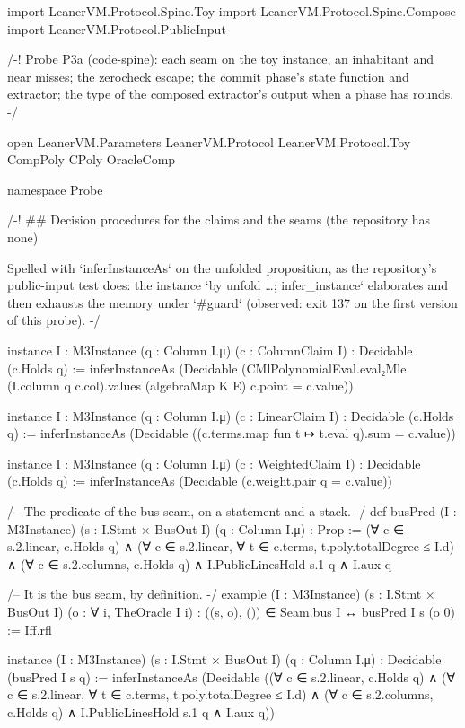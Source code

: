 
\begin{leancode}
import LeanerVM.Protocol.Spine.Toy
import LeanerVM.Protocol.Spine.Compose
import LeanerVM.Protocol.PublicInput

/-!
Probe P3a (code-spine): each seam on the toy instance, an inhabitant and near misses; the
zerocheck escape; the commit phase's state function and extractor; the type of the composed
extractor's output when a phase has rounds.
-/

open LeanerVM.Parameters LeanerVM.Protocol LeanerVM.Protocol.Toy CompPoly CPoly OracleComp

namespace Probe

/-! ## Decision procedures for the claims and the seams (the repository has none)

Spelled with `inferInstanceAs` on the unfolded proposition, as the repository's public-input
test does: the instance `by unfold …; infer_instance` elaborates and then exhausts the memory
under `#guard` (observed: exit 137 on the first version of this probe). -/

instance {I : M3Instance} (q : Column I.μ) (c : ColumnClaim I) : Decidable (c.Holds q) :=
  inferInstanceAs (Decidable (CMlPolynomialEval.eval₂Mle (I.column q c.col).values
    (algebraMap K E) c.point = c.value))

instance {I : M3Instance} (q : Column I.μ) (c : LinearClaim I) : Decidable (c.Holds q) :=
  inferInstanceAs (Decidable ((c.terms.map fun t ↦ t.eval q).sum = c.value))

instance {I : M3Instance} (q : Column I.μ) (c : WeightedClaim I) : Decidable (c.Holds q) :=
  inferInstanceAs (Decidable (c.weight.pair q = c.value))

/-- The predicate of the bus seam, on a statement and a stack. -/
def busPred (I : M3Instance) (s : I.Stmt × BusOut I) (q : Column I.μ) : Prop :=
  (∀ c ∈ s.2.linear, c.Holds q) ∧
  (∀ c ∈ s.2.linear, ∀ t ∈ c.terms, t.poly.totalDegree ≤ I.d) ∧
  (∀ c ∈ s.2.columns, c.Holds q) ∧ I.PublicLinesHold s.1 q ∧ I.aux q

/-- It is the bus seam, by definition. -/
example (I : M3Instance) (s : I.Stmt × BusOut I) (o : ∀ i, TheOracle I i) :
    ((s, o), ()) ∈ Seam.bus I ↔ busPred I s (o 0) := Iff.rfl

instance (I : M3Instance) (s : I.Stmt × BusOut I) (q : Column I.μ) :
    Decidable (busPred I s q) :=
  inferInstanceAs (Decidable ((∀ c ∈ s.2.linear, c.Holds q) ∧
    (∀ c ∈ s.2.linear, ∀ t ∈ c.terms, t.poly.totalDegree ≤ I.d) ∧
    (∀ c ∈ s.2.columns, c.Holds q) ∧ I.PublicLinesHold s.1 q ∧ I.aux q))


\end{leancode}
